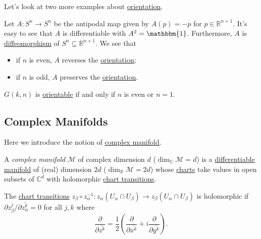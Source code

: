 Let's look at two more examples about \hyperref[def:orientation]{orientation}.

\begin{eg}
	Let \(A\colon S^n \to  S^n\) be the antipodal map given by \(A(p) = -p\) for \(p\in \mathbb{R} ^{n+1}\). It's easy to see that \(A\) is differentiable with \(A^2 = \mathbbm{1} \). Furthermore, \(A\) is \hyperref[def:diffeomorphism]{diffeomorphism} of \(S^n \subseteq \mathbb{R} ^{n+1}\). We see that
	\begin{itemize}
		\item if \(n\) is even, \(A\) reverses the \hyperref[def:orientation]{orientation};
		\item if \(n\) is odd, \(A\) preserves the \hyperref[def:orientation]{orientation}.
	\end{itemize}
\end{eg}

\begin{eg}
	\(G(k, n)\) is \hyperref[def:orientation]{orientable} if and only if \(n\) is even or \(n=1\).
\end{eg}

\subsection{Complex Manifolds}
Here we introduce the notion of \hyperref[def:complex-manifold]{complex manifold}.

\begin{definition}\label{def:complex-manifold}
	A \emph{complex manifold} \(\mathcal{M} \) of complex dimension \(d\) (\(\dim _{\mathbb{C} }\mathcal{M} = d\)) is a \hyperref[def:smooth-manifold]{differentiable manifold} of (real) dimension \(2d\) (\(\dim _\mathbb{R} \mathcal{M} =2d\)) whose \hyperref[def:coordinate-chart]{charts} take values in open subsets of \(\mathbb{C} ^d\) with holomorphic \hyperref[def:coordinate-transition]{chart transitions}.
\end{definition}

\begin{prev}
	The \hyperref[def:coordinate-transition]{chart transitions} \(z_\beta \circ z_\alpha ^{-1} \colon z_\alpha (U_\alpha \cap U_\beta ) \to  z_\beta (U_\alpha \cap U_\beta )\) is holomorphic if \(\partial z_\beta ^j / \partial \overline{z_\alpha ^k} = 0\) for all \(j, k\) where
	\[
		\frac{\partial }{\partial \overline{z^k}} = \frac{1}{2} \left( \frac{\partial }{\partial \overline{x^k}} + i \frac{\partial }{\partial \overline{y^k}} \right).
	\]
\end{prev}

